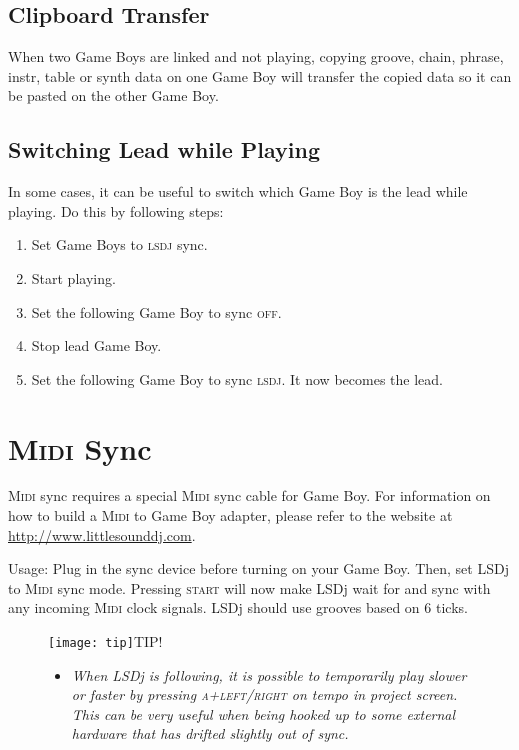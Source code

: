\subsection{Clipboard Transfer}

When two Game Boys are linked and not playing, copying groove, chain, phrase, instr, table or synth data on one Game Boy will transfer the copied data so it can be pasted on the other Game Boy.

\subsection{Switching Lead while Playing}

In some cases, it can be useful to switch which Game Boy is the lead while playing. Do this by following steps:

\begin{enumerate}
    \item Set Game Boys to \textsc{lsdj} sync.
    \item Start playing.
    \item Set the following Game Boy to sync \textsc{off}.
    \item Stop lead Game Boy.
    \item Set the following Game Boy to sync \textsc{lsdj}. It now becomes the lead.
\end{enumerate}

\section{\textsc{Midi} Sync}

\textsc{Midi} sync requires a special \textsc{Midi} sync cable for Game Boy. For information on how to build a \textsc{Midi} to Game Boy adapter, please refer to the website at \url{http://www.littlesounddj.com}.

Usage: Plug in the sync device before turning on your Game Boy. Then, set LSDj to \textsc{Midi} sync mode. Pressing \textsc{start} will now make LSDj wait for and sync with any incoming \textsc{Midi} clock signals. LSDj should use grooves based on 6 ticks.

\begin{figure}[hbtp]
\texttt{[image: tip]}TIP!
\begin{itemize}
        \item \textit{When LSDj is following, it is possible to temporarily play
slower or faster by pressing \textsc{a+left/right} on tempo in project screen. This can
be very useful when being hooked up to some external hardware that has drifted slightly out
of sync.}
	\end{itemize}
\end{figure}

